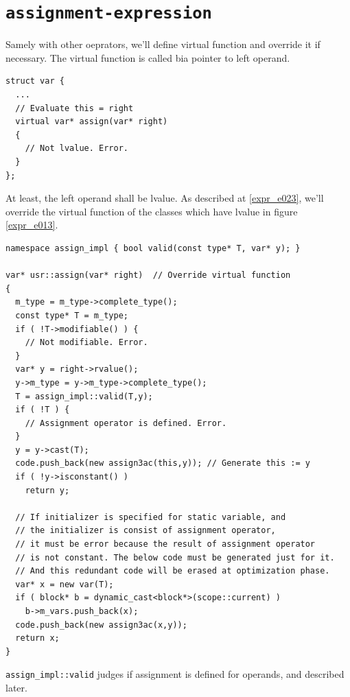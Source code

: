 \section{\tt{assignment-expression}}
\label{expr_e025}

Samely with other oeprators, we'll define virtual function and 
override it if necessary. The virtual function is called bia pointer
to left operand.
\begin{verbatim}
struct var {
  ...
  // Evaluate this = right
  virtual var* assign(var* right)
  {
    // Not lvalue. Error.
  }
};
\end{verbatim}
At least, the left operand shall be lvalue.
As described at \ref{expr_e023}, we'll override the virtual function
of the classes which have lvalue in figure \ref{expr_e013}.
\begin{verbatim}
namespace assign_impl { bool valid(const type* T, var* y); }

var* usr::assign(var* right)  // Override virtual function
{
  m_type = m_type->complete_type();
  const type* T = m_type;
  if ( !T->modifiable() ) {
    // Not modifiable. Error.
  }
  var* y = right->rvalue();
  y->m_type = y->m_type->complete_type();
  T = assign_impl::valid(T,y);
  if ( !T ) {
    // Assignment operator is defined. Error.
  }
  y = y->cast(T);
  code.push_back(new assign3ac(this,y)); // Generate this := y
  if ( !y->isconstant() )
    return y;

  // If initializer is specified for static variable, and
  // the initializer is consist of assignment operator,
  // it must be error because the result of assignment operator
  // is not constant. The below code must be generated just for it.
  // And this redundant code will be erased at optimization phase.
  var* x = new var(T);
  if ( block* b = dynamic_cast<block*>(scope::current) )
    b->m_vars.push_back(x);
  code.push_back(new assign3ac(x,y));
  return x;
}
\end{verbatim}
{\tt{assign\_impl::valid}} judges if assignment is defined for operands,
and described later.

